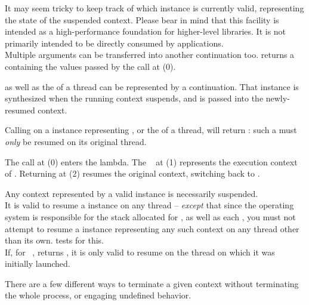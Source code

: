 It may seem tricky to keep track of which \cont instance is currently valid,
representing the state of the suspended context. Please bear in mind that this
facility is intended as a high-performance foundation for higher-level
libraries. It is not primarily intended to be directly consumed by applications.\\

Multiple arguments can be transferred into another continuation too.
 returns a 
containing the values passed by the \callcc call at (0).


\label{subsec:main}

\main as well as the \entryfn of a thread can be represented by a continuation.
That \cont instance is synthesized when the running context suspends, and is
passed into the newly-resumed context.

Calling \anythread on a \cont instance representing \main, or
the \entryfn of a thread, will return : such a \cont
must \emph{only} be resumed on its original thread.

The  call at (0) enters the lambda. The \cont\  at (1)
represents the execution context of \main. Returning  at (2) resumes the
original context, switching back to \main.


Any context represented by a valid \cont instance is necessarily suspended.\\
It is valid to resume a \cont instance on any thread -- \emph{except} that
since the operating system is responsible for the stack allocated for \main,
as well as each , you must not attempt to resume a \cont
instance representing any such context on any thread other
than its own. \anythread tests for this.\\
If, for \cont\ ,  returns , it is
only valid to resume  on the thread on which it was initially
launched.


There are a few different ways to terminate a given context without
terminating the whole process, or engaging undefined behavior.

